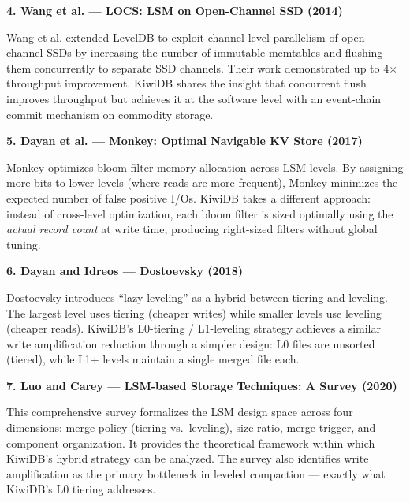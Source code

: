 \documentclass[oneside,a4paper,12pt]{book}
\begin{document}
\textbf{4. Wang et al. --- LOCS: LSM on Open-Channel SSD (2014) \cite{c9}}

Wang et al. extended LevelDB to exploit channel-level parallelism of open-channel SSDs by increasing the number of immutable memtables and flushing them concurrently to separate SSD channels. Their work demonstrated up to 4$\times$ throughput improvement. KiwiDB shares the insight that concurrent flush improves throughput but achieves it at the software level with an event-chain commit mechanism on commodity storage.

\vspace{1\baselineskip}

\textbf{5. Dayan et al. --- Monkey: Optimal Navigable KV Store (2017) \cite{c10}}

Monkey optimizes bloom filter memory allocation across LSM levels. By assigning more bits to lower levels (where reads are more frequent), Monkey minimizes the expected number of false positive I/Os. KiwiDB takes a different approach: instead of cross-level optimization, each bloom filter is sized optimally using the \emph{actual record count} at write time, producing right-sized filters without global tuning.

\vspace{1\baselineskip}

\textbf{6. Dayan and Idreos --- Dostoevsky (2018) \cite{c11}}

Dostoevsky introduces ``lazy leveling'' as a hybrid between tiering and leveling. The largest level uses tiering (cheaper writes) while smaller levels use leveling (cheaper reads). KiwiDB's L0-tiering / L1-leveling strategy achieves a similar write amplification reduction through a simpler design: L0 files are unsorted (tiered), while L1+ levels maintain a single merged file each.

\vspace{1\baselineskip}

\textbf{7. Luo and Carey --- LSM-based Storage Techniques: A Survey (2020) \cite{c12}}

This comprehensive survey formalizes the LSM design space across four dimensions: merge policy (tiering vs.\ leveling), size ratio, merge trigger, and component organization. It provides the theoretical framework within which KiwiDB's hybrid strategy can be analyzed. The survey also identifies write amplification as the primary bottleneck in leveled compaction --- exactly what KiwiDB's L0 tiering addresses.

\vspace{1\baselineskip}
\end{document}
